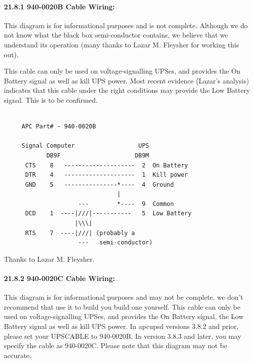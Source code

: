 {{{{{{{{{{\label{index-Cables-202}

\label{940_002d0020B-Cable-Wiring}

\paragraph*{21.8.1 940-0020B Cable Wiring:}

\label{index-Cables-203}
This diagram is for informational purposes and is not complete. Although we do
not know what the black box semi-conductor contains, we believe that we
understand its operation (many thanks to Lazar M. Fleysher for working this
out).  

This cable can only be used on voltage-signalling UPSes, and provides the On
Battery signal as well as kill UPS power. Most recent evidence (Lazar's
analysis) indicates that this cable under the right conditions may provide the
Low Battery signal. This is to be confirmed. 

\footnotesize
\begin{verbatim}
     
     APC Part# - 940-0020B
     
     Signal Computer                  UPS
            DB9F                     DB9M
      CTS    8   --------------------  2  On Battery
      DTR    4   --------------------  1  Kill power
      GND    5   ---------------*----  4  Ground
                                |
                     ---        *----  9  Common
      DCD    1  ----|///|-----------   5  Low Battery
                    |\\\|
      RTS    7  ----|///| (probably a
                     ---   semi-conductor)
\end{verbatim}
\normalsize

Thanks to Lazar M. Fleysher. 

\label{940_002d0020C-Cable-Wiring}

\paragraph*{21.8.2 940-0020C Cable Wiring:}

\label{index-Cables-204}
This diagram is for informational purposes and may not be complete, we don't
recommend that use it to build you build one yourself.  This cable can only be
used on voltage-signalling UPSes, and provides the On Battery signal, the Low
Battery signal as well as kill UPS power. In apcupsd versions 3.8.2 and prior,
please set your UPSCABLE to 940-0020B. In version 3.8.3 and later, you may
specify the cable as 940-0020C. Please note that this diagram may not be
accurate. 

}}}}}}}}}}

